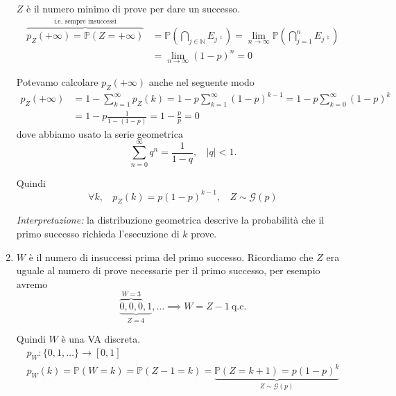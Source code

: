 \begin{enumerate}
$Z$ è il numero minimo di prove per dare un successo.\begin{equation*}
\begin{aligned}
\overbrace{p_{Z}( +\infty ) =\mathbb{P}( Z=+\infty )}^{\text{i.e. sempre insuccessi}} & =\mathbb{P}\left(\bigcap _{j\in \mathbb{N}} E_{j}\comp\right) =\lim _{n\rightarrow \infty }\mathbb{P}\left(\bigcap _{j=1}^{n} E_{j}\comp\right)\\
 & =\lim _{n\rightarrow \infty }( 1-p)^{n} =0
\end{aligned}
\end{equation*}

\begin{oss}
Potevamo calcolare $p_{Z}( +\infty )$ anche nel seguente modo
\begin{equation*}
\begin{aligned}
p_{Z}( +\infty ) & =1-\sum\limits _{k=1}^{\infty } p_{Z}( k) =1-p\sum\limits _{k=1}^{\infty }( 1-p)^{k-1} =1-p\sum\limits _{k=0}^{\infty }( 1-p)^{k}\\
 & =1-p\frac{1}{1-( 1-p)} =1-\frac{p}{p} =0
\end{aligned}
\end{equation*}
dove abbiamo usato la serie geometrica
\begin{equation*}
\sum\limits _{n=0}^{\infty } q^{n} =\frac{1}{1-q} ,\ \ \ \ | q| < 1.
\end{equation*}
\end{oss}

Quindi\begin{equation*}
\forall k,\ \ \ \ p_{Z}( k) =p( 1-p)^{k-1} ,\ \ \ \ \boxed{Z\sim \mathcal{G}( p)}
\end{equation*}

\textit{Interpretazione:} la distribuzione geometrica descrive la probabilità che il primo successo richieda l'esecuzione di $k$ prove.
\item $W$ è il numero di insuccessi prima del primo successo. Ricordiamo che $Z$ era uguale al numero di prove necessarie per il primo successo, per esempio avremo\begin{equation*}
\underbrace{\overbrace{0,0,0}^{W=3} ,1}_{Z=4} ,\dotsc \implies W=Z-1\ \text{q.c.}
\end{equation*}

Quindi $W$ è una VA discreta.\begin{gather*}
p_{W} :\{0,1,\dotsc \}\rightarrow [ 0,1]\\
p_{W}( k) =\mathbb{P}( W=k) =\mathbb{P}( Z-1=k) =\underbrace{\mathbb{P}( Z=k+1) =p( 1-p)^{k}}_{Z\sim \mathcal{G}( p)}
\end{gather*}


\end{enumerate}
